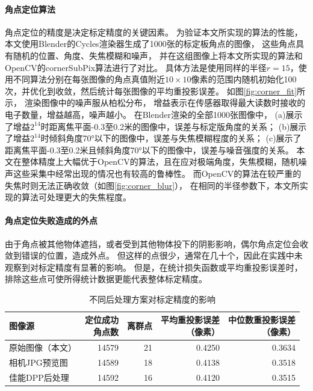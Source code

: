 \paragraph{角点定位算法}
角点定位的精度是决定标定精度的关键因素。
为验证本文所实现的算法的性能，本文使用Blender的Cycles渲染器生成了1000张的标定板角点的图像，
这些角点具有随机的位置、角度、失焦模糊和噪声，
并在这组图像上将本文所实现的算法和OpenCV的cornerSubPix算法进行了对比。
具体方法是使用同样的半径$r=15$，使用不同算法分别在每张图像的角点真值附近$10\times 10$像素的范围内随机初始化100次，并优化到收敛，然后统计每张图像的平均重投影误差。
如图\ref{fig:corner_fit}所示，
渲染图像中的噪声服从柏松分布，
增益表示在传感器取得最大读数时接收的电子数量，增益越高，噪声越小。
在Blender渲染的全部1000张图像中，
(a)展示了增益$2^{14}$时距离焦平面-0.3至0.2米的图像中，误差与标定版角度的关系；
(b)展示了增益$2^{14}$时倾斜角度70°以下的图像中，误差与失焦模糊程度的关系；
(c)展示了距离焦平面-0.3至0.2米且倾斜角度70°以下的图像中，误差与噪音强度的关系。
本文在整体精度上大幅优于OpenCV的算法，且在应对极端角度，失焦模糊，随机噪声这些采集中经常出现的情况也有较高的鲁棒性。
而OpenCV的算法在较严重的失焦时则无法正确收敛（如图\ref{fig:corner_blur}），
在相同的半径参数下，本文所实现的算法可处理更大的失焦程度。

\paragraph{角点定位失败造成的外点}
由于角点被其他物体遮挡，或者受到其他物体投下的阴影影响，偶尔角点定位会收敛到错误的位置，造成外点。
但这样的点很少，通常在几十个，因此在实践中未观察到对标定精度有显著的影响。
但是，在统计损失函数或平均重投影误差时，排除这些点可使所得统计数据更能代表整体标定精度。

\begin{table}
    \centering
    \caption{不同后处理方案对标定精度的影响}
    \begin{tabular}{l|rrrr}
        \toprule
        图像源 & \shortstack{定位成功\\角点数} & 离群点 & \shortstack{平均重投影误差\\（像素）}& \shortstack{中位数重投影误差\\（像素）} \\
        \midrule
        原始图像（本文） & 14579 & 21 & 0.4250 & 0.3634 \\
        相机JPG预览图   & 14589 & 18 & 0.4138 & 0.3518 \\
        佳能DPP后处理   & 14592 & 16 & 0.4120 & 0.3515 \\
        \bottomrule
    \end{tabular}
    \label{tab:camera_postprocess}
\end{table}

